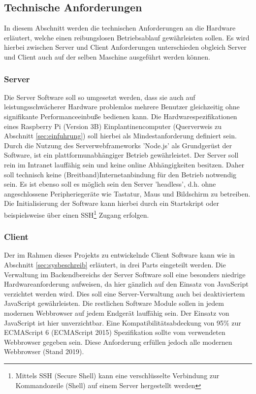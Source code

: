\subsection{Technische Anforderungen}\label{sec:techanford}
In diesem Abschnitt werden die technischen Anforderungen an die Hardware erläutert, welche einen reibungslosen Betriebsablauf gewährleisten sollen. Es wird hierbei zwischen Server und Client Anforderungen unterschieden obgleich Server und Client auch auf der selben Maschine ausgeführt werden können. 
\subsubsection{Server}\label{sec:servertech}
Die Server Software soll so umgesetzt werden, dass sie auch auf leistungsschwächerer Hardware problemlos mehrere Benutzer gleichzeitig ohne signifikante Performanceeinbuße bedienen kann. Die Hardwarespezifikationen eines Raspberry Pi (Version 3B) Einplantinencomputer (Querverweis zu Abschnitt \ref{sec:einfuhrung}) soll hierbei als Mindestanforderung definiert sein. Durch die Nutzung des Serverwebframeworks 'Node.js' als Grundgerüst der Software, ist ein plattformunabhängiger Betrieb gewährleistet. Der Server soll rein im Intranet lauffähig sein und keine online Abhängigkeiten besitzen. Daher soll technisch keine (Breitband)Internetanbindung für den Betrieb notwendig sein. Es ist ebenso soll es möglich sein den Server 'headless', d.h. ohne angeschlossene Peripheriegeräte wie Tastatur, Maus und Bildschirm zu betreiben. Die Initialisierung der Software kann hierbei durch ein Startskript oder beispielsweise über einen SSH\footnote{Mittels SSH (Secure Shell) kann eine verschlüsselte Verbindung zur Kommandozeile (Shell) auf einem Server hergestellt werden} Zugang erfolgen.
\subsubsection{Client}\label{sec:clienttech}
Der im Rahmen dieses Projekts zu entwickelnde Client Software kann wie in Abschnitt \ref{sec:sysbeschreib} erläutert, in drei Parts eingeteilt werden. Die Verwaltung im Backendbereichs der Server Software soll eine besonders niedrige Hardwareanforderung aufweisen, da hier gänzlich auf den Einsatz von JavaScript verzichtet werden wird. Dies soll eine Server-Verwaltung auch bei deaktiviertem JavaScript gewährleisten. Die restlichen Software Module sollen in jedem modernen Webbrowser auf jedem Endgerät lauffähig sein. Der Einsatz von JavaScript ist hier unverzichtbar. Eine Kompatibilitätsabdeckung von 95\% zur ECMAScript 6 (ECMAScript 2015) Spezifikation sollte vom verwendeten Webbrowser gegeben sein. Diese Anforderung erfüllen jedoch alle modernen Webbrowser (Stand 2019)\cite{ECMAScri7:online}. 
